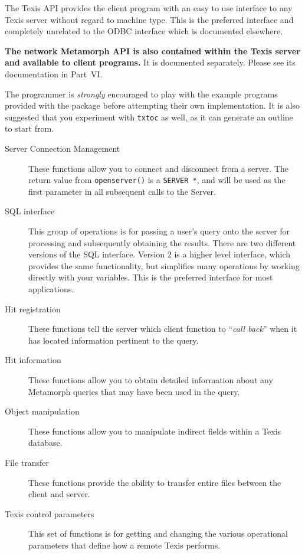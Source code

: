 \DESCRIPTION

The Texis API provides the client program with an easy to use interface to
any Texis server without regard to machine type.  This is the preferred
interface and completely unrelated to the ODBC interface which is
documented elsewhere.

{\bf The network Metamorph API is also contained within the Texis server
and available to client programs.} It is documented separately.  Please
see its documentation in Part~VI.

The programmer is {\em strongly} encouraged to play with the example
programs provided with the package before attempting their own
implementation.  It is also suggested that you experiment with
\verb|txtoc| as well, as it can generate an outline to start from.

\begin{description}
\item[Server Connection Management]

    These functions allow you to connect and disconnect from a server.
    The return value from \verb`openserver()` is a \verb`SERVER *`, and
    will be used as the first parameter in all subsequent calls to
    the Server.

\item[SQL interface]

    This group of operations is for passing a user's query onto the
    server for processing and subsequently obtaining the results.
    There are two different versions of the SQL interface.
    Version 2 is a higher level interface, which provides
    the same functionality, but simplifies many operations by
    working directly with your variables.  This is the preferred
    interface for most applications.

\item[Hit registration]

    These functions tell the server which client function to ``{\em call back}''
    when it has located information pertinent to the query.

\item[Hit information]

    These functions allow you to obtain detailed information about
    any Metamorph queries that may have been used in the query.

\item[Object manipulation]

    These functions allow you to manipulate indirect fields
    within a Texis database.

\item[File transfer]

    These functions provide the ability to transfer entire files
    between the client and server.

\item[Texis control parameters]

    This set of functions is for getting and changing the various
    operational parameters that define how a remote Texis performs.

\end{description}

